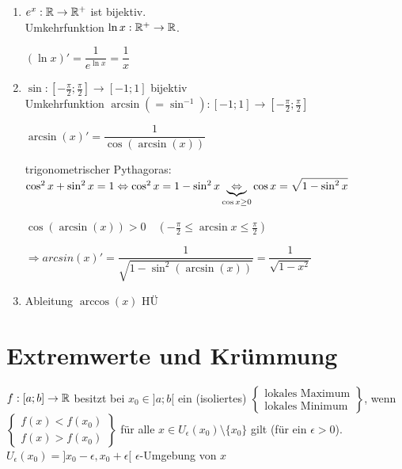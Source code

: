 \Bsp
\begin{enumerate}
	\item $e^x:\mathbb{R}\to\mathbb{R}^+$ ist bijektiv.\\
	Umkehrfunktion $\ln x:\mathbb{R}^+\to\mathbb{R}$.
	
	$(\ln x)' = \dfrac{1}{e^{\ln x}} = \dfrac{1}{x}$
	
	\item $\sin:[-\frac{\pi}{2};\frac{\pi}{2}]\to[-1;1]$ bijektiv\\
	Umkehrfunktion $\arcsin(=\sin^{-1}):[-1;1]\to[-\frac{\pi}{2};\frac{\pi}{2}]$
	
	$\arcsin(x)'=\dfrac{1}{\cos(\arcsin(x))}$
	
	trigonometrischer Pythagoras: $\cos^2x+\sin^2x=1\\
	\Leftrightarrow\cos^2x=1-\sin^2x\\
	\underbrace{\Leftrightarrow}_{\cos x\ge0}\cos x = \sqrt{1-\sin^2x}$
	
	$\cos(\arcsin(x)) > 0 \quad (-\frac{\pi}{2}\le\arcsin x\le\frac{\pi}{2})$
	
	$\Rightarrow arcsin(x)'=\dfrac{1}{\sqrt{1-\sin^2(\arcsin(x))}} = \dfrac{1}{\sqrt{1-x^2}}$
	
	\item Ableitung $\arccos(x)$ HÜ
\end{enumerate}

\clearpage
\section{Extremwerte und Krümmung}
\Def $f:[a;b]\to\mathbb{R}$ besitzt bei $x_0\in]a;b[$ ein (isoliertes) $\left\{\begin{array}{c}\text{lokales Maximum}\\\text{lokales Minimum}\end{array}\right\}$, wenn $\left\{\begin{array}{c}f(x)<f(x_0)\\f(x)>f(x_0)\end{array}\right\}$ für alle $x\in U_\epsilon(x_0)\setminus\{x_0\}$ gilt (für ein $\epsilon>0$).\\
$U_\epsilon(x_0)=]x_0-\epsilon,x_0+\epsilon[$ {\flqq$\epsilon$-Umgebung von $x$\frqq}

